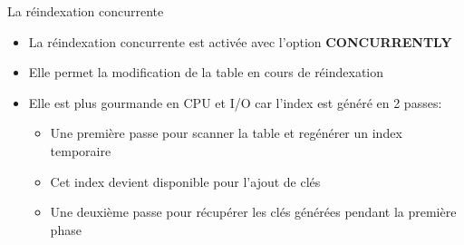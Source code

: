 
\begin{frame}{La réindexation concurrente}

\begin{itemize}
   \item La réindexation concurrente est activée avec l'option \textbf{CONCURRENTLY}
   \item Elle permet la modification de la table en cours de réindexation
   \item Elle est plus gourmande en CPU et I/O car l'index est généré en 2 passes:  
   \begin{itemize}
      \item Une première passe pour scanner la table et regénérer un index temporaire
      \item Cet index devient disponible pour l'ajout de clés
      \item Une deuxième passe pour récupérer les clés générées pendant la première phase
   \end{itemize}


\end{itemize}

\begin{toile}
\end{toile}

\end{frame}



